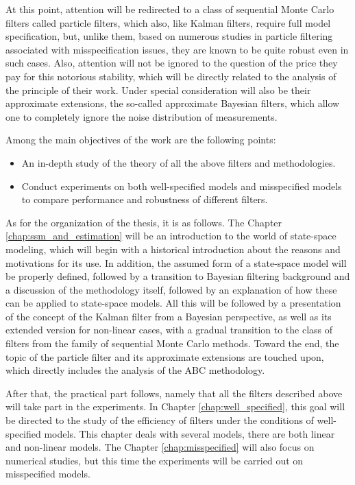 At this point, attention will be redirected to a class of sequential Monte Carlo filters called particle filters, which also, like Kalman filters, require full model specification, but, unlike them, based on numerous studies in particle filtering associated with misspecification issues, they are known to be quite robust even in such cases. Also, attention will not be ignored to the question of the price they pay for this notorious stability, which will be directly related to the analysis of the principle of their work. Under special consideration will also be their approximate extensions, the so-called approximate Bayesian filters, which allow one to completely ignore the noise distribution of measurements.

Among the main objectives of the work are the following points:
\begin{itemize}
    \item An in-depth study of the theory of all the above filters and methodologies.
    \item Conduct experiments on both well-specified models and misspecified models to compare performance and robustness of different filters.
\end{itemize}

As for the organization of the thesis, it is as follows. The Chapter \ref{chap:ssm_and_estimation} will be an introduction to the world of state-space modeling, which will begin with a historical introduction about the reasons and motivations for its use. In addition, the assumed form of a state-space model will be properly defined, followed by a transition to Bayesian filtering background and a discussion of the methodology itself, followed by an explanation of how these can be applied to state-space models. All this will be followed by a presentation of the concept of the Kalman filter from a Bayesian perspective, as well as its extended version for non-linear cases, with a gradual transition to the class of filters from the family of sequential Monte Carlo methods. Toward the end, the topic of the particle filter and its approximate extensions are touched upon, which directly includes the analysis of the ABC methodology.

After that, the practical part follows, namely that all the filters described above will take part in the experiments. In Chapter \ref{chap:well_specified}, this goal will be directed to the study of the efficiency of filters under the conditions of well-specified models. This chapter deals with several models, there are both linear and non-linear models. The Chapter \ref{chap:misspecified} will also focus on numerical studies, but this time the experiments will be carried out on misspecified models.

